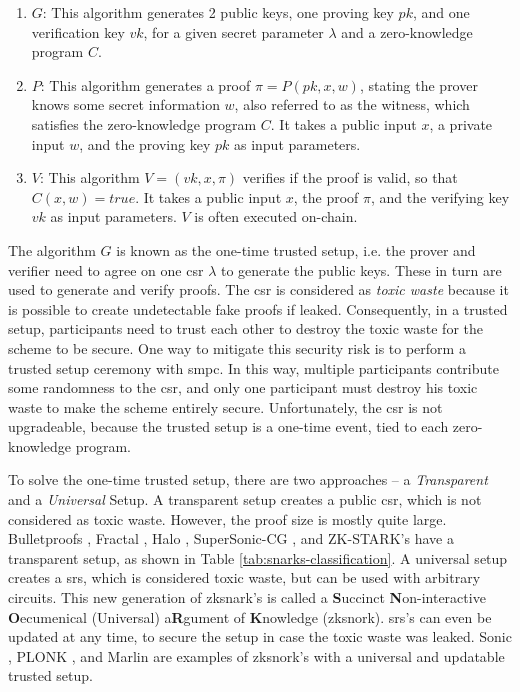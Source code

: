 \begin{enumerate}
    \item $G$: This algorithm generates 2 public keys, one proving key $pk$, and one verification key $vk$, for a given secret parameter $\lambda$ and a zero-knowledge program $C$.
    \item $P$: This algorithm generates a proof $\pi = P(pk, x, w)$, stating the prover knows some secret information $w$, also referred to as the witness, which satisfies the zero-knowledge program $C$. It takes a public input $x$, a private input $w$, and the proving key $pk$ as input parameters.
    \item $V$: This algorithm $V = (vk, x, \pi)$ verifies if the proof is valid, so that $C(x, w) = true$. It takes a public input $x$, the proof $\pi$, and the verifying key $vk$ as input parameters. $V$ is often executed on-chain.
\end{enumerate}

The algorithm $G$ is known as the one-time trusted setup, i.e. the prover and verifier need to agree on one \acrfull{csr} $\lambda$ to generate the public keys. These in turn are used to generate and verify proofs. The \acrshort{csr} is considered as \emph{toxic waste} because it is possible to create undetectable fake proofs if leaked. Consequently, in a trusted setup, participants need to trust each other to destroy the toxic waste for the scheme to be secure. One way to mitigate this security risk is to perform a trusted setup ceremony with \acrfull{smpc}. In this way, multiple participants contribute some randomness to the \acrshort{csr}, and only one participant must destroy his toxic waste to make the scheme entirely secure. Unfortunately, the \acrshort{csr} is not upgradeable, because the trusted setup is a one-time event, tied to each zero-knowledge program.

To solve the one-time trusted setup, there are two approaches -- a \emph{Transparent} and a \emph{Universal} Setup. A transparent setup creates a public \acrshort{csr}, which is not considered as toxic waste. However, the proof size is mostly quite large. Bulletproofs \cite{bunzBulletproofsShortProofs2018}, Fractal \cite{chiesaFractalPostquantumTransparent2020}, Halo \cite{boweRecursiveProofComposition}, SuperSonic-CG \cite{bunzTransparentSNARKsDARK2020}, and ZK-STARK's \cite{ben-sassonScalableTransparentPostquantum} have a transparent setup, as shown in Table \ref{tab:snarks-classification}. A universal setup creates a \acrfull{srs}, which is considered toxic waste, but can be used with arbitrary circuits. This new generation of \acrshort{zksnark}'s is called a \textbf{S}uccinct \textbf{N}on-interactive \textbf{O}ecumenical (Universal) a\textbf{R}gument of \textbf{K}nowledge (\acrshort{zksnork}). \acrshort{srs}'s can even be updated at any time, to secure the setup in case the toxic waste was leaked. Sonic \cite{mallerSonicZeroKnowledgeSNARKs2019}, PLONK \cite{gabizonPlonKPermutationsLagrangebases}, and Marlin \cite{chiesaMarlinPreprocessingZkSNARKs2020} are examples of \acrshort{zksnork}'s with a universal and updatable trusted setup.

